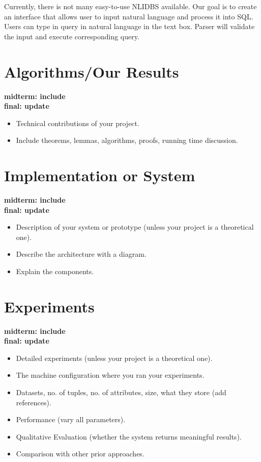 \documentclass[twocolumn]{article}
\newcommand{\red}[1]{{\bf \color{red}#1}}
\newcommand{\blue}[1]{{\bf \color{blue}#1}}
\begin{document}
\begin{itemize}
	Currently, there is not many easy-to-use NLIDBS available. Our goal is to create an interface that allows user to input natural language and process it into SQL. Users can type in query in natural language in the text box. Parser will validate the input and execute corresponding query.\\
\end{itemize}

\section{Algorithms/Our Results}
\blue{
midterm: include\\
final: update\\
}

\red{
\begin{itemize}
\itemsep0em
\item Technical contributions of your project.
\item Include theorems, lemmas, algorithms, proofs, running time discussion.
\end{itemize}
}

\section{Implementation or System}
\blue{
midterm: include\\
final: update\\
}

\red{
\begin{itemize}
\itemsep0em
\item Description of your system or prototype (unless your project is a theoretical one).
\item Describe the architecture with a diagram.
\item Explain the components.
\end{itemize}
}

\section{Experiments}
\blue{
midterm: include\\
final: update\\
}

\red{
\begin{itemize}
\itemsep0em
\item Detailed experiments (unless your project is a theoretical one).
\item The machine configuration where you ran your experiments.
\item Datasets, no. of tuples, no. of attributes, size, what they store (add references).
\item Performance (vary all parameters).
\item Qualitative Evaluation (whether the system returns meaningful results).
\item Comparison with other prior approaches.
\end{itemize}
}
\end{document}
